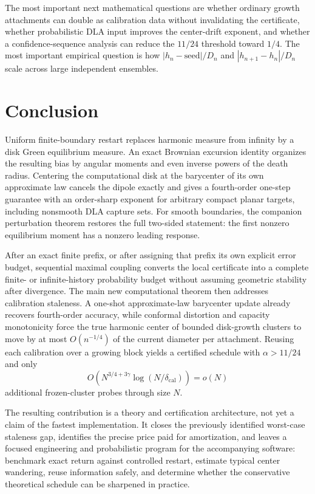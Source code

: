 \documentclass[11pt]{article}
\theoremstyle{mainthm}
\theoremstyle{definition}
\theoremstyle{remark}
\begin{document}
The most important next mathematical questions are whether ordinary growth attachments can double as calibration data without invalidating the certificate, whether probabilistic DLA input improves the center-drift exponent, and whether a confidence-sequence analysis can reduce the $11/24$ threshold toward $1/4$. The most important empirical question is how $|h_n-\text{seed}|/D_n$ and $|h_{n+1}-h_n|/D_n$ scale across large independent ensembles.

\section{Conclusion}

Uniform finite-boundary restart replaces harmonic measure from infinity by a disk Green equilibrium measure. An exact Brownian excursion identity organizes the resulting bias by angular moments and even inverse powers of the death radius. Centering the computational disk at the barycenter of its own approximate law cancels the dipole exactly and gives a fourth-order one-step guarantee with an order-sharp exponent for arbitrary compact planar targets, including nonsmooth DLA capture sets. For smooth boundaries, the companion perturbation theorem restores the full two-sided statement: the first nonzero equilibrium moment has a nonzero leading response.

After an exact finite prefix, or after assigning that prefix its own explicit error budget, sequential maximal coupling converts the local certificate into a complete finite- or infinite-history probability budget without assuming geometric stability after divergence. The main new computational theorem then addresses calibration staleness. A one-shot approximate-law barycenter update already recovers fourth-order accuracy, while conformal distortion and capacity monotonicity force the true harmonic center of bounded disk-growth clusters to move by at most $O(n^{-1/4})$ of the current diameter per attachment. Reusing each calibration over a growing block yields a certified schedule with $\alpha>11/24$ and only
\[
  O\!\left(N^{3/4+3\gamma}\log(N/\delta_{\mathrm{cal}})\right)=o(N)
\]
additional frozen-cluster probes through size $N$.

The resulting contribution is a theory and certification architecture, not yet a claim of the fastest implementation. It closes the previously identified worst-case staleness gap, identifies the precise price paid for amortization, and leaves a focused engineering and probabilistic program for the accompanying software: benchmark exact return against controlled restart, estimate typical center wandering, reuse information safely, and determine whether the conservative theoretical schedule can be sharpened in practice.
\end{document}
